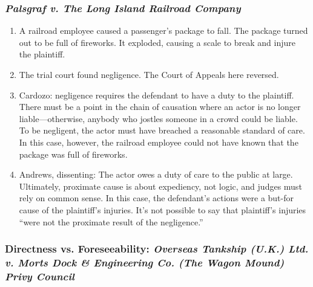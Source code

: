 \subsubsection{\emph{Palsgraf v. The Long Island Railroad Company}}

\begin{enumerate}
    \item A railroad employee caused a passenger's package to fall. The 
    package turned out to be full of fireworks. It exploded, causing a scale 
    to break and injure the plaintiff.
    \item The trial court found negligence. The Court of Appeals here 
    reversed.
    \item Cardozo: negligence requires the defendant to have a duty to the 
    plaintiff. There must be a point in the chain of causation where an actor 
    is no longer liable---otherwise, anybody who jostles someone in a crowd 
    could be liable. To be negligent, the actor must have breached a 
    reasonable standard of care. In this case, however, the railroad employee 
    could not have known that the package was full of fireworks.
    \item Andrews, dissenting: The actor owes a duty of care to the public at 
    large. Ultimately, proximate cause is about expediency, not logic, and 
    judges must rely on common sense. In this case, the defendant's actions 
    were a but-for cause of the plaintiff's injuries. It's not possible to say 
    that plaintiff's injuries ``were not the proximate result of the 
    negligence.''
\end{enumerate}

\subsubsection{Directness vs. Foreseeability: \emph{Overseas Tankship (U.K.) 
Ltd. v. Morts Dock \& Engineering Co. (The Wagon Mound) Privy Council}}

